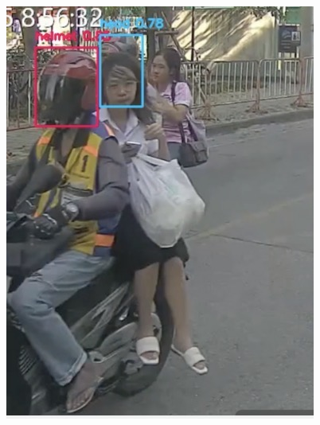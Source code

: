 \begin{center}
	\begin{minipage}{0.45\textwidth}
		\centering
		\includegraphics[width=\linewidth]{limitation2.png}
		\vspace{0.5em} %
		

\end{minipage}
\end{center}
